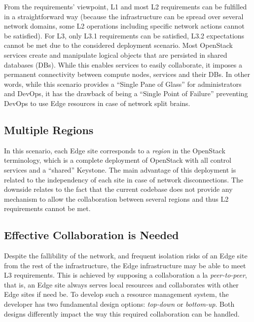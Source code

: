 From the requirements' viewpoint, L1 and most L2 requirements can be
fulfilled in a straightforward way (because the infrastructure can be
spread over several network domains, some L2 operations including
specific network actions cannot be satisfied). For L3, only L3.1
requirements can be satisfied, L3.2 expectations cannot be met due to
the considered deployment scenario. Most OpenStack services create and
manipulate logical objects that are persisted in shared databases
(DBs). While this enables services to easily collaborate, it imposes
a permanent connectivity between compute nodes, services and their
DBs.  In other words, while this scenario provides a ``Single Pane of
Glass'' for administrators and DevOps, it has the drawback of being a
``Single Point of Failure'' preventing DevOps to use Edge resources in
case of network split brains.

\subsection{Multiple Regions}
In this scenario, each Edge site corresponds to a \emph{region}
in the OpenStack terminology, which is a complete deployment of
OpenStack with all control services and a ``shared'' Keystone.
The main advantage of this deployment is related to the independency
of each site in case of network disconnections.
The downside relates to the fact that the current codebase does not
provide any mechanism to allow the collaboration between several
regions and thus L2 requirements cannot be met.~


\subsection{Effective Collaboration is Needed}
Despite the fallibility of the network, and frequent isolation risks
of an Edge site from the rest of the infrastructure, the Edge
infrastructure may be able to meet L3 requirements. This
is achieved by supposing a collaboration a la \emph{peer-to-peer},
that is, an Edge site always serves local resources and collaborates
with other Edge sites if need be. To develop such a resource
management system, the developer has two fundamental design options:
\emph{top-down} or \emph{bottom-up}. Both designs differently impact the way
this required collaboration can be handled.

